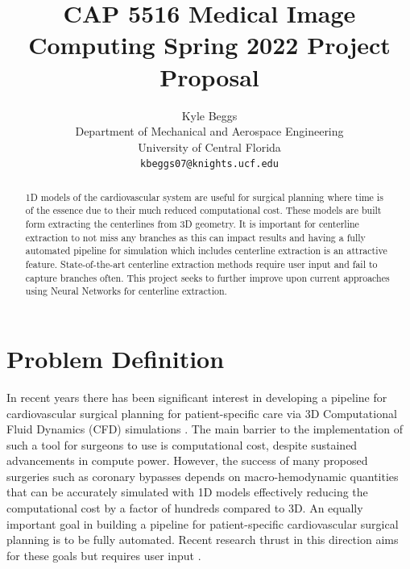 \documentclass[10pt,twocolumn,letterpaper]{article}
\begin{document}
\title{CAP 5516 Medical Image Computing Spring 2022 Project Proposal}

\author{Kyle Beggs\\
Department of Mechanical and Aerospace Engineering\\ 
University of Central Florida\\
{\tt\small kbeggs07@knights.ucf.edu}}

\maketitle
\ificcvfinal\thispagestyle{empty}\fi


\begin{abstract}
    1D models of the cardiovascular system are useful for surgical planning where time is of the essence due to their much reduced computational cost. These models are built form extracting the centerlines from 3D geometry. It is important for centerline extraction to not miss any branches as this can impact results and having a fully automated pipeline for simulation which includes centerline extraction is an attractive feature. State-of-the-art centerline extraction methods require user input and fail to capture branches often. This project seeks to further improve upon current approaches using Neural Networks for centerline extraction.
\end{abstract}


\section{Problem Definition}

In recent years there has been significant interest in developing a pipeline for cardiovascular surgical planning for patient-specific care via 3D Computational Fluid Dynamics (CFD) simulations \cite{morrisonAdvancingRegulatoryScience2018}. The main barrier to the implementation of such a tool for surgeons to use is computational cost, despite sustained advancements in compute power. However, the success of many proposed surgeries such as coronary bypasses depends on macro-hemodynamic quantities that can be accurately simulated with 1D models effectively reducing the computational cost by a factor of hundreds compared to 3D. An equally important goal in building a pipeline for patient-specific cardiovascular surgical planning is to be fully automated. Recent research thrust in this direction aims for these goals but requires user input \cite{pfallerAutomatedGeneration0D2021}.
 
\end{document}

